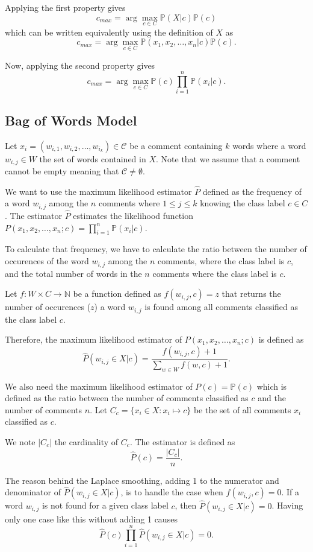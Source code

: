 \documentclass{article}
\begin{document}
Applying the first property gives
$$c_{max} = \arg\max_{c \in C} \mathbb{P}(X | c)\mathbb{P}(c)$$
which can be written equivalently using the definition of $X$ as
$$c_{max} = \arg\max_{c \in C} \mathbb{P}(x_1, x_2, \ldots, x_n | c)\mathbb{P}(c).$$

Now, applying the second property gives
$$c_{max} = \arg\max_{c \in C} \mathbb{P}(c) \prod\limits_{i = 1}^n \mathbb{P}(x_i | c).$$

\subsection{Bag of Words Model}
Let $x_i = (w_{i,1}, w_{i,2}, \ldots, w_{i_k}) \in \mathcal{C}$ be a comment containing $k$ words where a word $w_{i,j} \in W$ the set of words contained in $X$. Note that we assume that a comment cannot be empty meaning that $\mathcal{C} \neq \emptyset$.

We want to use the maximum likelihood estimator $\widehat{P}$ defined as the frequency of a word $w_{i,j}$ among the $n$ comments where $1 \leq j \leq k$ knowing the class label $c \in C$. The estimator $\widehat{P}$ estimates the likelihood function $P(x_1,x_2,\ldots,x_n ; c) = \prod\limits_{i=1}^n \mathbb{P}(x_i | c)$.

To calculate that frequency, we have to calculate the ratio between the number of occurences of the word $w_{i,j}$ among the $n$ comments, where the class label is $c$, and the total number of words in the $n$ comments where the class label is $c$.

Let $f : W \times C \longrightarrow \mathbb{N}$ be a function defined as $f(w_{i,j}, c) = z$ that returns the number of occurences ($z$) a word $w_{i,j}$ is found among all comments classified as the class label $c$.

Therefore, the maximum likelihood estimator of $P(x_1,x_2,\ldots,x_n ; c)$ is defined as
$$\widehat{P}(w_{i,j} \in X | c) = \frac{f(w_{i,j}, c) + 1}{\sum\limits_{w \in W} f(w, c) + 1}.$$

We also need the maximum likelihood estimator of $P(c) = \mathbb{P}(c)$ which is defined as the ratio between the number of comments classified as $c$ and the number of comments $n$. Let $C_c = \{x_i \in X : x_i \mapsto c\}$ be the set of all comments $x_i$ classified as $c$. 

We note $|C_c|$ the cardinality of $C_c$. The estimator is defined as
$$\widehat{P}(c) = \frac{|C_c|}{n}.$$

The reason behind the Laplace smoothing, adding 1 to the numerator and denominator of $\widehat{P}(w_{i,j} \in X | c)$, is to handle the case when $f(w_{i,j}, c) = 0$. If a word $w_{i,j}$ is not found for a given class label $c$, then $\widehat{P}(w_{i,j} \in X | c) = 0$. Having only one case like this without adding 1 causes 
$$\widehat{P}(c) \prod\limits_{i=1}^n \widehat{P}(w_{i,j} \in X | c) = 0.$$
\end{document}
